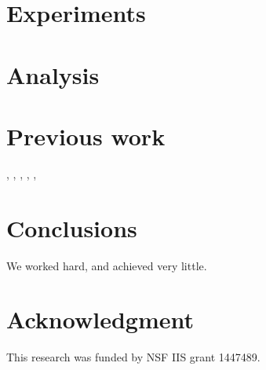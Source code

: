 \documentclass[10pt]{proc}
\begin{document}
\section{Experiments}\label{experiments}

\section{Analysis}\label{analysis}

\section{Previous work}\label{previous work}

\cite{gaffney_trajectory_1999},
\cite{gorur_dirichlet_2010},
\cite{kamper_gibbs_2013},
\cite{kottas_nonparametric_2005},
\cite{neal_markov_2000},
\cite{rasmussen_infinite_1999}


\section{Conclusions}\label{conclusions}
We worked hard, and achieved very little.

\section*{Acknowledgment}
This research was funded by NSF IIS grant 1447489.




\end{document}
